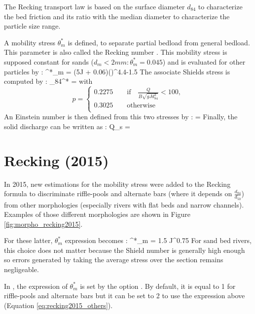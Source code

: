 The Recking \cite{recking2013} transport law is based on the surface diameter $d_{84}$ to characterize the bed friction and its ratio with the median diameter to characterize the particle size range. 

A mobility stress $\theta^*_m$ is defined, to separate partial bedload from general bedload. This parameter is also called the Recking number \cite{lefort}. 
This mobility stress is supposed constant for sands ($d_m < 2mm : \theta^*_m=0.045$) and is evaluated for other particles by :
\bequ
	\theta^*_m = \left(5J + 0.06\right){\left(\right)}^{4.4-1.5}
\eequ
The associate Shields stress is computed by :
\bequ
	\theta_{84}^* = 
\eequ
with \[p = \left\{
        \begin{array}{ll}
            0.2275 \qquad \textrm{if}\quad \frac{Q}{B\sqrt{gJd_{84}^3}}<100, \\
            0.3025 \qquad \textrm{otherwise}\\
        \end{array}
    \right.\]
An Einstein number is then defined from this two stresses by :
\bequ
	 \Phi = 
\eequ
Finally, the solid discharge can be written as :
\bequ
	Q_s =  \Phi {}
\eequ

\section{Recking (2015)}
\label{app:recking2015}

In 2015, new estimations for the mobility stress were added to the Recking formula to discriminate riffle-pools and alternate bars (where it depends on $\frac{d_{84}}{d_{50}}$) from other morphologies (especially rivers with flat beds and narrow channels)\cite{recking2015}. Examples of those different morphologies are shown in Figure \ref{fig:morpho_recking2015}. 

For these latter, $\theta^*_m$ expression becomes :
\bequ
	\theta^*_m = 1.5 J^{0.75}
	\label{eq:recking2015_others}
\eequ
For sand bed rivers, this choice does not matter because the Shield number is generally high enough so errors generated by taking the average stress over the section remains negligeable. 

In \courlis, the expression of $\theta^*_m$ is set by the option . By default, it is equal to 1 for riffle-pools and alternate bars but it can be set to 2 to use the expression above (Equation \ref{eq:recking2015_others}).

